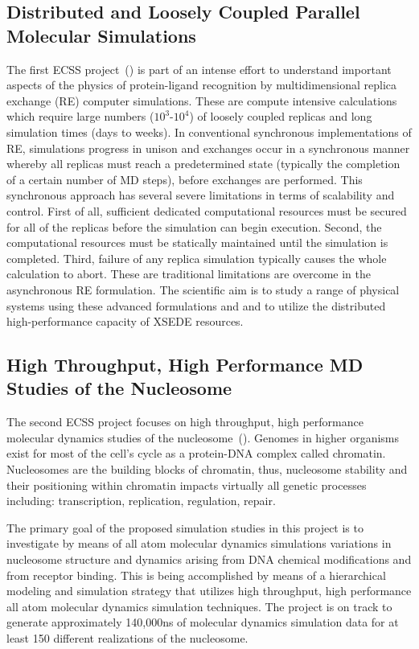\documentclass{sig-alternate}
\begin{document}
\subsection{Distributed and Loosely Coupled Parallel Molecular Simulations}
The first ECSS project~(\cite{RonLevy}) is part of an intense effort
to understand important aspects of the physics of protein-ligand
recognition by multidimensional replica exchange (RE) computer
simulations. These are compute intensive calculations which require
large numbers ($10^3$-$10^4$) of loosely coupled replicas and long
simulation times (days to weeks). In conventional synchronous
implementations of RE, simulations progress in unison and exchanges
occur in a synchronous manner whereby all replicas must reach a
predetermined state (typically the completion of a certain number of
MD steps), before exchanges are performed. This synchronous approach
has several severe limitations in terms of scalability and
control. First of all, sufficient dedicated computational resources
must be secured for all of the replicas before the simulation can
begin execution. Second, the computational resources must be
statically maintained until the simulation is completed. Third,
failure of any replica simulation typically causes the whole
calculation to abort. These are traditional limitations are overcome
in the asynchronous RE formulation. The scientific aim is to study a
range of physical systems using these advanced formulations and and to
utilize the distributed high-performance capacity of XSEDE resources.

\subsection{High Throughput, High Performance MD Studies of the
  Nucleosome}

The second ECSS project focuses on high throughput, high performance
molecular dynamics studies of the
nucleosome~(\cite{TomBishop}). Genomes in higher organisms exist for
most of the cell's cycle as a protein-DNA complex called chromatin.
Nucleosomes are the building blocks of chromatin, thus, nucleosome
stability and their positioning within chromatin impacts virtually all
genetic processes including: transcription, replication, regulation,
repair.

The primary goal of the proposed simulation studies in this project is to
investigate by means of all atom molecular dynamics simulations variations in
nucleosome structure and dynamics arising from DNA chemical modifications and
from receptor binding. This is being accomplished by means of a hierarchical
modeling and simulation strategy that utilizes high throughput, high
performance all atom molecular dynamics simulation techniques. The project is
on track to generate approximately 140,000ns of molecular dynamics simulation
data for at least 150 different realizations of the nucleosome.
\end{document}
